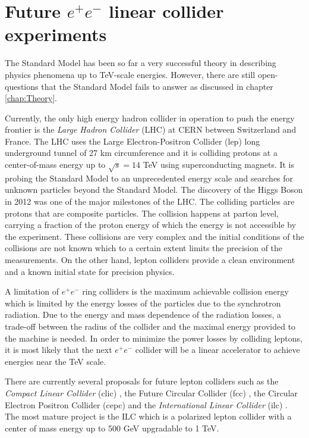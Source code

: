 \chapter{Future $e^+e^-$ linear collider experiments}
\label{chap:FutureColliders}

The Standard Model has been so far a very successful theory in describing physics phenomena up to TeV-scale energies. However, there are still open-questions that the Standard Model fails to answer as discussed in chapter \ref{chap:Theory}.

Currently, the only high energy hadron collider in operation to push the energy frontier is the \textit{Large Hadron Collider} (LHC) at CERN between Switzerland and France. The LHC uses the Large Electron-Positron Collider (\acrshort{lep}) long underground tunnel of 27 km circumference and it is colliding protons at a center-of-mass energy up to $\sqrt{s} = 14$ TeV using superconducting magnets. It is probing the Standard Model to an unprecedented energy scale and searches for unknown particles beyond the Standard Model. The discovery of the Higgs Boson in 2012 \cite{Aad:2012tfa, Chatrchyan:2012xdj} was one of the major milestones of the LHC. The colliding particles are protons that are composite particles. The collision happens at parton level, carrying a fraction of the proton energy of which the energy is not accessible by the experiment. These collisions are very complex and the initial conditions of the collisions are not known which to a certain extent limits the precision of the measurements. On the other hand, lepton colliders provide a clean environment and a known initial state for precision physics.

A limitation of $e^+e^-$ ring colliders is the maximum achievable collision energy which is limited by the energy losses of the particles due to the synchrotron radiation. Due to the energy and mass dependence of the radiation losses, a trade-off between the radius of the collider and the maximal energy provided to the machine is needed. In order to minimize the power losses by colliding leptons, it is most likely that the next $e^+e^-$ collider will be a linear accelerator to achieve energies near the TeV scale.

There are currently several proposals for future lepton colliders such as the \textit{Compact Linear Collider} (\acrshort{clic}) \cite{CLIC_CDR}, the Future Circular Collider (\acrshort{fcc}) \cite{Benedikt:2015kqj}, the Circular Electron Positron Collider (\acrshort{cepc}) \cite{CEPC-SPPCStudyGroup:2015csa, CEPC-SPPCStudyGroup:2015esa} and the \textit{International Linear Collider} (\acrshort{ilc}) \cite{ILC_TDR_Vol1}. The most mature project is the ILC which is a polarized lepton collider with a center of mass energy up to 500 GeV upgradable to 1 TeV.

